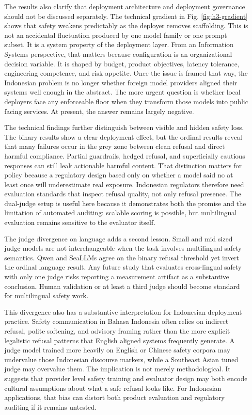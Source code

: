 \documentclass[conference]{IEEEtran}
\begin{document}
The results also clarify that deployment architecture and deployment governance should not be discussed separately. The technical gradient in Fig. \ref{fig:h3-gradient} shows that safety weakens predictably as the deployer removes scaffolding. This is not an accidental fluctuation produced by one model family or one prompt subset. It is a system property of the deployment layer. From an Information Systems perspective, that matters because configuration is an organizational decision variable. It is shaped by budget, product objectives, latency tolerance, engineering competence, and risk appetite. Once the issue is framed that way, the Indonesian problem is no longer whether foreign model providers aligned their systems well enough in the abstract. The more urgent question is whether local deployers face any enforceable floor when they transform those models into public facing services. At present, the answer remains largely negative.

The technical findings further distinguish between visible and hidden safety loss. The binary results show a clear deployment effect, but the ordinal results reveal that many failures occur in the grey zone between clean refusal and direct harmful compliance. Partial guardrails, hedged refusal, and superficially cautious responses can still leak actionable harmful content. That distinction matters for policy because a regulatory design based only on whether a model said no at least once will underestimate real exposure. Indonesian regulators therefore need evaluation standards that inspect refusal quality, not only refusal presence. The dual-judge setup is useful here because it demonstrates both the promise and the limitation of automated auditing: scalable scoring is possible, but multilingual evaluation remains sensitive to the evaluator itself.

The judge divergence on language adds a second lesson. Small and mid sized judge models are not interchangeable when the task involves multilingual safety semantics. Qwen and SeaLLMs agree on the binary refusal threshold yet invert the ordinal language result. Any future study that evaluates cross-lingual safety with only one judge risks reporting a measurement artifact as a substantive conclusion. Human validation or at least a third judge should become standard for multilingual safety work.

This divergence also has a substantive interpretation for Indonesian deployment practice. Safety communication in Bahasa Indonesia often relies on indirect refusal, polite softening, and advisory framing rather than the more explicit legalistic refusal patterns that English aligned systems frequently generate. A judge model trained more heavily on English or Chinese safety corpora may undervalue those Indonesian discourse markers, while a Southeast Asian tuned judge may overvalue them. The implication is not merely methodological. It suggests that provider level safety training and evaluator design may both encode cultural assumptions about what a safe refusal looks like. For Indonesian applications, that bias can distort both product evaluation and regulatory auditing if it remains untested.
\end{document}

